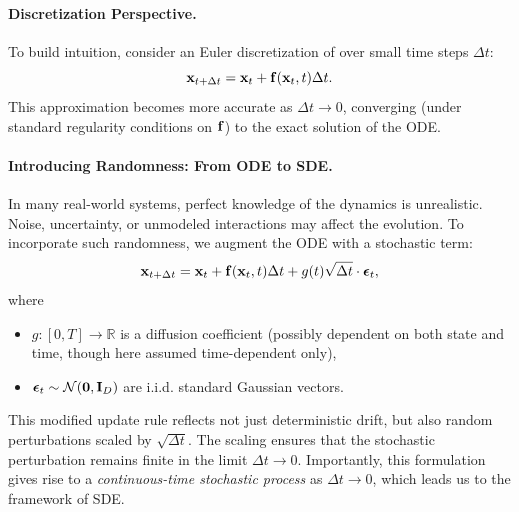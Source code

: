 \paragraph{Discretization Perspective.} To build intuition, consider an Euler discretization of  over small time steps $ \Delta t $:
\begin{equation*}
    {\mathbf{x}}_{t+\Delta t} = {\mathbf{x}}_t + {\mathbf{f}}({\mathbf{x}}_t, t) \Delta t.
\end{equation*}
This approximation becomes more accurate as $ \Delta t \to 0 $, converging (under standard regularity conditions on $ {\mathbf{f}} $) to the exact solution of the ODE.

\paragraph{Introducing Randomness: From ODE to SDE.} In many real-world systems, perfect knowledge of the dynamics is unrealistic. Noise, uncertainty, or unmodeled interactions may affect the evolution. To incorporate such randomness, we augment the ODE with a stochastic term:
\begin{equation}
    {\mathbf{x}}_{t+\Delta t} = {\mathbf{x}}_t + {\mathbf{f}}({\mathbf{x}}_t, t)\Delta t + g(t)\sqrt{\Delta t} \cdot \bm{\epsilon}_t,
    \label{eq:euler-sde}
\end{equation}
where
\begin{itemize}
    \item $g: [0,T] \to \mathbb{R}$ is a diffusion coefficient (possibly dependent on both state and time, though here assumed time-dependent only),
    \item $\bm{\epsilon}_t \sim \mathcal{N}(\bm{0}, {\mathbf{I}}_D)$ are i.i.d. standard Gaussian vectors.
\end{itemize}

This modified update rule reflects not just deterministic drift, but also random perturbations scaled by $ \sqrt{\Delta t} $. The scaling ensures that the stochastic perturbation remains finite in the limit $ \Delta t \to 0 $. Importantly, this formulation gives rise to a \emph{continuous-time stochastic process} as $ \Delta t \to 0 $, which leads us to the framework of SDE.


